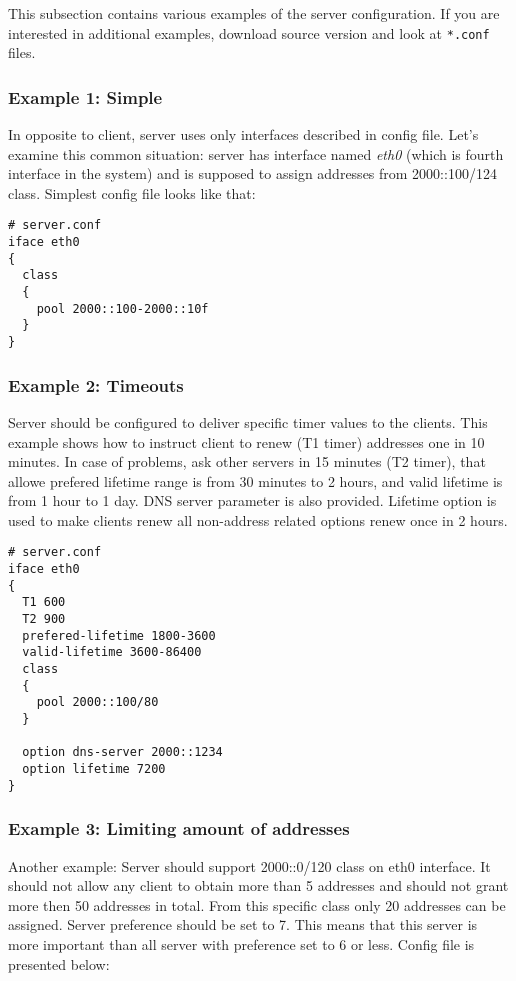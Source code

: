 This subsection contains various examples of the server
configuration. If you are interested in additional examples, download source version
and look at \verb+*.conf+ files.


\subsubsection{Example 1: Simple}

In opposite to client, server uses only interfaces described in config
file. Let's examine this common situation: server has interface
named \emph{eth0} (which is fourth interface in the system) and is
supposed to assign addresses from 2000::100/124 class. Simplest config
file looks like that:

\begin{lstlisting}
# server.conf
iface eth0
{ 
  class
  {
    pool 2000::100-2000::10f
  } 
}
\end{lstlisting}

\subsubsection{Example 2: Timeouts}
Server should be configured to deliver specific timer values to the
clients. This example shows how to instruct client to renew (T1 timer) 
addresses one in 10 minutes. In case of problems, ask other servers in
15 minutes (T2 timer), that allowe prefered lifetime range is from 30
minutes to 2 hours, and valid lifetime is from 1 hour to 1 day. DNS
server parameter is also provided. Lifetime option is used to make
clients renew all non-address related options renew once in 2 hours.

\begin{lstlisting}
# server.conf
iface eth0 
{
  T1 600
  T2 900
  prefered-lifetime 1800-3600
  valid-lifetime 3600-86400
  class
  {
    pool 2000::100/80
  } 

  option dns-server 2000::1234
  option lifetime 7200
}
\end{lstlisting}

\subsubsection{Example 3: Limiting amount of addresses}
Another example: Server should support 2000::0/120 class on eth0
interface. It should not allow any client to obtain more than 5
addresses and should not grant more then 50 addresses in total. From
this specific class only 20 addresses can be assigned. Server
preference should be set to 7. This means that this server is more
important than all server with preference set to 6 or less. 
Config file is presented below:

